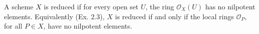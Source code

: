 A scheme $X$ is reduced if for every open set $U$, the ring $\mathcal{O}_X(U)$ has no nilpotent elements. Equivalently (Ex. 2.3), $X$ is reduced if and only if the local rings $\mathcal{O}_P$, for all $P \in X$, have no nilpotent elements.
